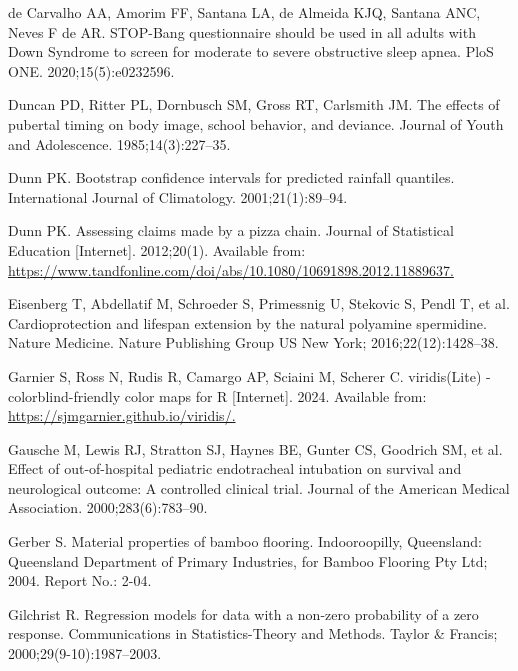 \documentclass[
  11pt,
  a4paper,
  krantz2]{krantz}
\newlength{\cslhangindent}
\newenvironment{CSLReferences}[2] %
 {\begin{list}{}{%
  \setlength{\itemindent}{0pt}
  \setlength{\leftmargin}{0pt}
  \setlength{\parsep}{0pt}
  \ifodd #1
   \setlength{\leftmargin}{\cslhangindent}
   \setlength{\itemindent}{-1\cslhangindent}
  \fi
  \setlength{\itemsep}{#2\baselineskip}}}
 {\end{list}}
\begin{document}
\begin{footnotesize}
\begin{CSLReferences}{1}{0}
de Carvalho AA, Amorim FF, Santana LA, de Almeida KJQ, Santana ANC, Neves F de AR. {STOP}-{B}ang questionnaire should be used in all adults with {D}own {S}yndrome to screen for moderate to severe obstructive sleep apnea. {PloS} {ONE}. 2020;15(5):e0232596.

Duncan PD, Ritter PL, Dornbusch SM, Gross RT, Carlsmith JM. The effects of pubertal timing on body image, school behavior, and deviance. Journal of Youth and Adolescence. 1985;14(3):227--35.

Dunn PK. Bootstrap confidence intervals for predicted rainfall quantiles. International Journal of Climatology. 2001;21(1):89--94.

Dunn PK. Assessing claims made by a pizza chain. Journal of Statistical Education {[}Internet{]}. 2012;20(1). Available from: \href{https://www.tandfonline.com/doi/abs/10.1080/10691898.2012.11889637}{https://www.tandfonline.com/doi/abs/10.1080/10691898.2012.11889637.}

Eisenberg T, Abdellatif M, Schroeder S, Primessnig U, Stekovic S, Pendl T, et al. Cardioprotection and lifespan extension by the natural polyamine spermidine. Nature Medicine. Nature Publishing Group US New York; 2016;22(12):1428--38.

Garnier S, Ross N, Rudis R, Camargo AP, Sciaini M, Scherer C. {viridis(Lite)} - colorblind-friendly color maps for {R} {[}Internet{]}. 2024. Available from: \href{https://sjmgarnier.github.io/viridis/}{https://sjmgarnier.github.io/viridis/.}

Gausche M, Lewis RJ, Stratton SJ, Haynes BE, Gunter CS, Goodrich SM, et al. Effect of out-of-hospital pediatric endotracheal intubation on survival and neurological outcome: A controlled clinical trial. Journal of the {A}merican Medical Association. 2000;283(6):783--90.

Gerber S. Material properties of bamboo flooring. {I}ndooroopilly, {Q}ueensland: {Q}ueensland Department of Primary Industries, for {B}amboo {F}looring {Pty} {Ltd}; 2004. Report No.: 2-04.

Gilchrist R. Regression models for data with a non-zero probability of a zero response. Communications in Statistics-Theory and Methods. Taylor \& Francis; 2000;29(9-10):1987--2003.


\end{CSLReferences}
\end{footnotesize}
\end{document}
